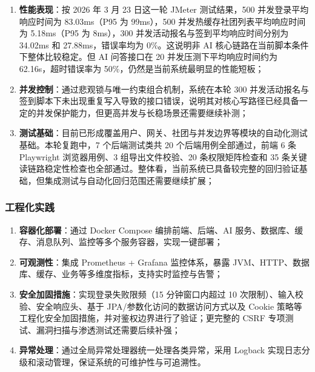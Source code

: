 \begin{enumerate}
  \item \textbf{性能表现}：按 2026 年 3 月 23 日这一轮 JMeter 测试结果，500 并发登录平均响应时间为 83.03ms（P95 为 99ms），500 并发热缓存社团列表平均响应时间为 5.18ms（P95 为 8ms），300 并发活动报名与签到平均响应时间分别为 34.02ms 和 27.88ms，错误率均为 0\%。这说明非 AI 核心链路在当前脚本条件下整体比较稳定。但 AI 问答接口在 20 并发压测下平均响应时间约为 62.16s，超时错误率为 50\%，仍然是当前系统最明显的性能短板；

  \item \textbf{并发控制}：通过悲观锁与唯一约束组合机制，系统在本轮 300 并发活动报名与签到脚本下未出现重复写入导致的接口错误，说明其对核心写路径已经具备一定的并发保护能力，但更高并发与长稳场景还需要继续补测；

  \item \textbf{测试基础}：目前已形成覆盖用户、网关、社团与并发边界等模块的自动化测试基础。本轮复跑中，7 个后端测试类共 20 个后端用例全部通过，前端 6 条 Playwright 浏览器用例、3 组导出文件校验、20 条权限矩阵检查和 35 条关键读链路稳定性检查也全部通过。整体看，当前系统已具备较完整的回归验证基础，但集成测试与自动化回归范围还需要继续扩展；

\end{enumerate}

\subsubsection{工程化实践}

\begin{enumerate}
  \item \textbf{容器化部署}：通过 Docker Compose 编排前端、后端、AI 服务、数据库、缓存、消息队列、监控等多个服务容器，实现一键部署；

  \item \textbf{可观测性}：集成 Prometheus + Grafana 监控体系，暴露 JVM、HTTP、数据库、缓存、业务等多维度指标，支持实时监控与告警；

  \item \textbf{安全加固措施}：实现登录失败限频（15 分钟窗口内超过 10 次限制）、输入校验、安全响应头、基于 JPA/参数化访问的数据访问方式以及 Cookie 策略等工程化安全加固措施，并对鉴权边界进行了验证；更完整的 CSRF 专项测试、漏洞扫描与渗透测试还需要后续补强；

  \item \textbf{异常处理}：通过全局异常处理器统一处理各类异常，采用 Logback 实现日志分级和滚动管理，保证系统的可维护性与可追溯性。
\end{enumerate}

